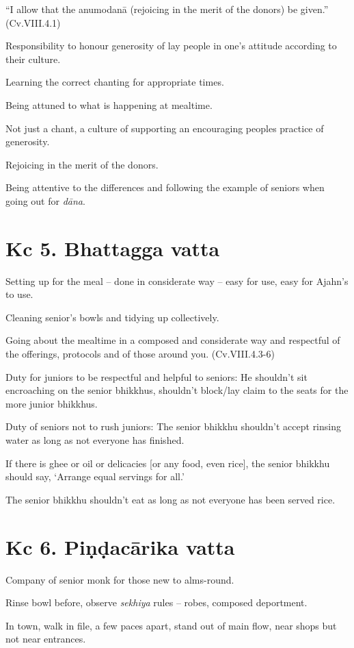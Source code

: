 ``I allow that the anumodanā (rejoicing in the merit of the donors) be
given.'' (Cv.VIII.4.1)

Responsibility to honour generosity of lay people in one's attitude
according to their culture.

Learning the correct chanting for appropriate times.

Being attuned to what is happening at mealtime.

Not just a chant, a culture of supporting an encouraging peoples
practice of generosity.

Rejoicing in the merit of the donors.

Being attentive to the differences and following the example of seniors
when going out for \emph{dāna}.

\section{Kc 5. Bhattagga vatta}

Setting up for the meal -- done in considerate way -- easy for use, easy
for Ajahn's to use.

Cleaning senior's bowls and tidying up collectively.

Going about the mealtime in a composed and considerate way and
respectful of the offerings, protocols and of those around you.
(Cv.VIII.4.3-6)

Duty for juniors to be respectful and helpful to seniors: He shouldn't
sit encroaching on the senior bhikkhus, shouldn't block/lay claim to the
seats for the more junior bhikkhus.

Duty of seniors not to rush juniors: The senior bhikkhu shouldn't accept
rinsing water as long as not everyone has finished.

If there is ghee or oil or delicacies {[}or any food, even rice{]}, the
senior bhikkhu should say, `Arrange equal servings for all.'

The senior bhikkhu shouldn't eat as long as not everyone has been served
rice.

\section{Kc 6. Piṇḍacārika vatta}

Company of senior monk for those new to alms-round.

Rinse bowl before, observe \emph{sekhiya} rules -- robes, composed
deportment.

In town, walk in file, a few paces apart, stand out of main flow, near
shops but not near entrances.

